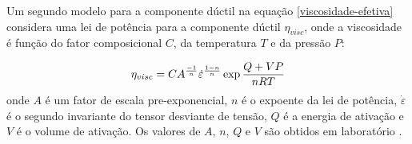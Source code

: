 
Um segundo modelo para a componente dúctil na equação \ref{viscosidade-efetiva} considera uma lei de potência para a componente dúctil $\eta_{visc}$, onde a viscosidade é função do fator composicional $C$, da temperatura $T$ e da pressão $P$:

\begin{equation}{\label{power-law}}
    \eta_{visc} = C A^{\frac{-1}{n}} \dot{\varepsilon}^{\frac{1-n}{n}} \exp{\frac{Q+V P}{nRT}}
\end{equation}
\noindent onde $A$ é um fator de escala pre-exponencial, $n$ é o expoente da lei de potência, $\dot{\varepsilon}$ é o segundo invariante do tensor desviante de tensão, $Q$ é a energia de ativação e $V$ é o volume de ativação. Os valores de $A$, $n$, $Q$ e $V$ são obtidos em laboratório \citep{karato1993,gleason1995}.





